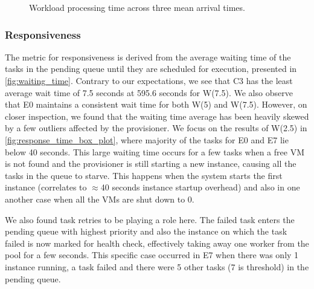 \documentclass[a4paper]{IEEEtran}
\begin{document}
\begin{figure}[bp]
  \caption{Workload processing time across three mean arrival times.}
  \label{fig:processing_time}
\end{figure}

\subsubsection{Responsiveness}

The metric for responsiveness is derived from the average waiting time of the tasks in the pending queue until they are scheduled for execution, presented in \autoref{fig:waiting_time}. Contrary to our expectations, we see that \textsc{C3} has the least average wait time of 7.5 seconds at 595.6 seconds for W(7.5). We also observe that \textsc{E0} maintains 
a consistent wait time for both W(5) and W(7.5). However, on closer inspection, we found that the  waiting time average has been heavily skewed by a few outliers affected by the provisioner. We focus
on the results of W(2.5) in \autoref{fig:response_time_box_plot}, where majority of the tasks for
E0 and E7 lie below 40 seconds. This large waiting time occurs for a few tasks when a free VM is not found and the provisioner is still starting a new instance, causing all the tasks in the queue to starve. This happens when the system starts the first instance (correlates to $\approx$40 seconds instance startup overhead) and also in one another case when all the VMs are shut down to 0. 

We also found task retries to be playing a role here. The failed task enters the pending queue with highest priority and also the instance on which the task failed is now marked for health check, effectively taking away one worker from the pool for a few seconds. This specific case occurred in E7 when there was only 1 instance running, a task failed and there were 5 other tasks (7 is threshold) in the pending queue.
\end{document}
